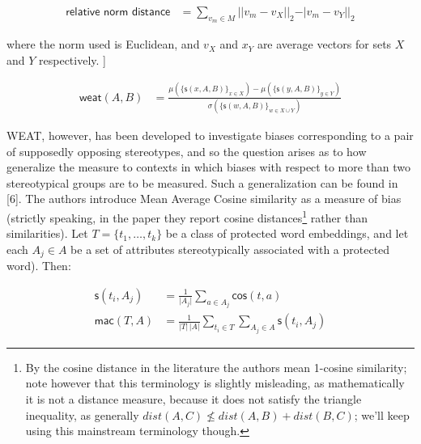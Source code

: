 \documentclass[
  10pt,
  dvipsnames,enabledeprecatedfontcommands, twocolumn]{scrartcl}
\begin{document}
\vspace{-2mm}

\footnotesize

\begin{align}
\textsf{relative norm distance} & = \sum_{v_m\in M} \vert \vert v_m - v_X\vert \vert_2 - \vert v_m - v_Y\vert \vert_2
\end{align}

\normalsize

\noindent where the norm used is Euclidean, and \(v_X\) and \(x_Y\) are
average vectors for sets \(X\) and \(Y\) respectively. {]}

\vspace{-2mm}

\footnotesize

\begin{align}
\mathsf{weat}(A,B) & = \frac{
\mu(\{\mathsf{s}(x,A,B)\}_{x\in X}) -\mu(\{\mathsf{s}(y,A,B)\}_{y\in Y}) 
}{
\sigma(\{\mathsf{s}(w,A,B)\}_{w\in X\cup Y})
}
\end{align}

\normalsize

WEAT, however, has been developed to investigate biases corresponding to
a pair of supposedly opposing stereotypes, and so the question arises as
to how generalize the measure to contexts in which biases with respect
to more than two stereotypical groups are to be measured. Such a
generalization can be found in {[}6{]}. The authors introduce Mean
Average Cosine similarity as a measure of bias (strictly speaking, in
the paper they report cosine distances\footnote{By the cosine distance
  in the literature the authors mean 1-cosine similarity; note however
  that this terminology is slightly misleading, as mathematically it is
  not a distance measure, because it does not satisfy the triangle
  inequality, as generally \(dist(A,C) \not \leq dist(A,B)+ dist(B,C)\);
  we'll keep using this mainstream terminology though.} rather than
similarities). Let \(T = \{t_1, \dots, t_k\}\) be a class of protected
word embeddings, and let each \(A_j\in A\) be a set of attributes
stereotypically associated with a protected word). Then:

\vspace{-2mm }
\footnotesize

\begin{align}
\mathsf{s}(t_i, A_j) & = \frac{1}{\vert A_j\vert}\sum_{a\in A_j}\mathsf{cos}(t,a) \\
\mathsf{mac}(T,A) & = \frac{1}{\vert T \vert \,\vert A\vert}\sum_{t_i \in T }\sum_{A_j \in A} \mathsf{s}(t_i,A_j)
\end{align}
\end{document}
